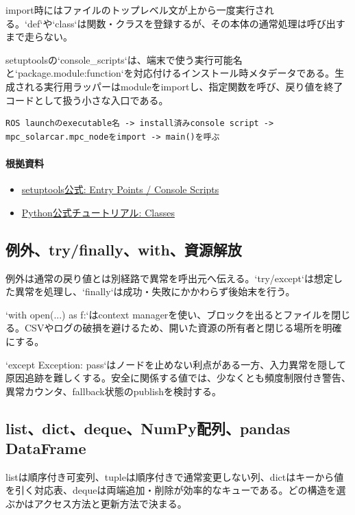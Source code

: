 \documentclass[a4paper,11pt]{article}
\begin{document}
import時にはファイルのトップレベル文が上から一度実行される。`def`や`class`は関数・クラスを登録するが、その本体の通常処理は呼び出すまで走らない。


setuptoolsの`console\_scripts`は、端末で使う実行可能名と`package.module:function`を対応付けるインストール時メタデータである。生成される実行用ラッパーはmoduleをimportし、指定関数を呼び、戻り値を終了コードとして扱う小さな入口である。


\begin{lstlisting}
ROS launchのexecutable名 -> install済みconsole script -> mpc_solarcar.mpc_nodeをimport -> main()を呼ぶ
\end{lstlisting}

\paragraph{根拠資料}
\begin{itemize}[leftmargin=1.6em]
\item \href{https://setuptools.pypa.io/en/latest/userguide/entry_point.html}{setuptools公式: Entry Points / Console Scripts}
\item \href{https://docs.python.org/3/tutorial/classes.html}{Python公式チュートリアル: Classes}
\end{itemize}

\subsection{例外、try/finally、with、資源解放}
例外は通常の戻り値とは別経路で異常を呼出元へ伝える。`try/except`は想定した異常を処理し、`finally`は成功・失敗にかかわらず後始末を行う。


`with open(...) as f:`はcontext managerを使い、ブロックを出るとファイルを閉じる。CSVやログの破損を避けるため、開いた資源の所有者と閉じる場所を明確にする。


`except Exception: pass`はノードを止めない利点がある一方、入力異常を隠して原因追跡を難しくする。安全に関係する値では、少なくとも頻度制限付き警告、異常カウンタ、fallback状態のpublishを検討する。



\subsection{list、dict、deque、NumPy配列、pandas DataFrame}
listは順序付き可変列、tupleは順序付きで通常変更しない列、dictはキーから値を引く対応表、dequeは両端追加・削除が効率的なキューである。どの構造を選ぶかはアクセス方法と更新方法で決まる。
\end{document}
